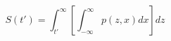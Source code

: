 \begin{equation}
S(t') = \int_{t'}^{\infty} \left[ \int_{-\infty}^\infty p(z,x) dx\right] dz
\end{equation}